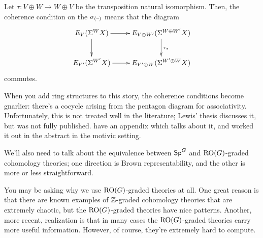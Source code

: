 Let $\tau\colon V\oplus W\to W\oplus V$ be the transposition natural isomorphism. Then, the coherence condition on
the $\sigma_{(\text{--})}$ means that the diagram
\[\xymatrix{
	E_V(\Sigma^W X)\ar[r]\ar[d] & E_{V\oplus W'}(\Sigma^{W\oplus W'}X)\ar[d]^{\tau_*}\\
	E_{V'}(\Sigma^{W'}X)\ar[r] & E_{V'\oplus W}(\Sigma^{W'\oplus W}X)
}\]
commutes.
\begin{rem}
When you add ring structures to this story, the coherence conditions become gnarlier: there's a cocycle arising
from the pentagon diagram for associativity. Unfortunately, this is not treated well in the literature; Lewis'
thesis discusses it, but was not fully published.  have an appendix which talks about it, and
 worked it out in the abstract in the motivic setting.
\end{rem}
We'll also need to talk about the equivalence between $\mathsf{Sp}^G$ and $\mathrm{RO}(G)$-graded cohomology theories; one
direction is Brown representability, and the other is more or less straightforward.

You may be asking why we use $\mathrm{RO}(G)$-graded theories at all. One great reason is that there are known examples of
$\mathbb Z$-graded cohomology theories that are extremely chaotic, but the $\mathrm{RO}(G)$-graded theories have nice patterns.
Another, more recent, realization is that in many cases the $\mathrm{RO}(G)$-graded theories carry more useful information.
However, of course, they're extremely hard to compute.
